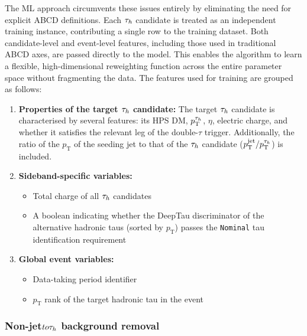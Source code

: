 The \ac{ML} approach circumvents these issues entirely by eliminating the need for explicit ABCD definitions. Each $\tau_h$ candidate is treated as an independent training instance, contributing a single row to the training dataset. Both candidate-level and event-level features, including those used in traditional ABCD axes, are passed directly to the model. This enables the algorithm to learn a flexible, high-dimensional reweighting function across the entire parameter space without fragmenting the data. The features used for training are grouped as follows:

\begin{enumerate}[label=(\roman*)]

    \item \textbf{Properties of the target $\tau_h$ candidate:} The target $\tau_h$ candidate is characterised by several features: its \ac{HPS} \ac{DM}, $p_\text{T}^{\tau_h}$,  $\eta$, electric charge, and whether it satisfies the relevant leg of the double-$\tau$ trigger. Additionally, the ratio of the $p_\text{T}$ of the seeding jet to that of the $\tau_h$ candidate ($p_\text{T}^\text{jet} / p_\text{T}^{\tau_h}$) is included.

    \item \textbf{Sideband-specific variables:}
    \begin{itemize}
        \item Total charge of all $\tau_h$ candidates
        \item A boolean indicating whether the DeepTau discriminator of the alternative hadronic taus (sorted by $p_\text{T}$) passes the \texttt{Nominal} tau identification requirement
    \end{itemize}

    \item \textbf{Global event variables:}
    \begin{itemize}
        \item Data-taking period identifier
        \item $p_\text{T}$ rank of the target hadronic tau in the event
    \end{itemize}

\end{enumerate}

\subsubsection{\texorpdfstring{Non-jet$to \tau_h$ background removal}{Non-jet to hadronic tau background removal}}
\label{Section:Chapter6_BDT_NonJet_BkgRemoval}

